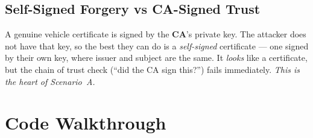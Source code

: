 \documentclass[11pt,a4paper]{article}
\begin{document}
\subsection{Self-Signed Forgery vs CA-Signed Trust}
A genuine vehicle certificate is signed by the \textbf{CA}'s private key. The
attacker does not have that key, so the best they can do is a \emph{self-signed}
certificate --- one signed by their own key, where issuer and subject are the
same. It \emph{looks} like a certificate, but the chain of trust check
(``did the CA sign this?'') fails immediately. \emph{This is the heart of
Scenario~A.}

\section{Code Walkthrough}
\end{document}
